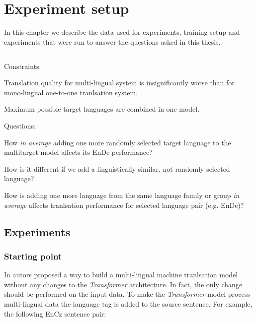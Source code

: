 \chapter{Experiment setup}
\label{chapter:experiment_setup}

In this chapter we describe the data used for experiments, training setup
and experiments that were run to answer the questions asked in this thesis.

\section{}
\label{section:questions_and_constraints}

Constraints:
\begin{displayquote}
	Translation quality for multi-lingual system is insignificantly worse than for
	mono-lingual one-to-one tranlsation system.

	Maximum possible target languages are combined in one model.
\end{displayquote}

Questions:
\begin{displayquote}
	How \emph{in average} adding one more randomly selected target language
	to the multitarget model affects its En\to{}De performance?

	How is it different if we add a linguistically similar, not randomly selected language?

	How is adding one more language from the same language family or group 
	\emph{in average} affects tranlsation performance for selected language
	pair (e.g. En\to{}De)?
\end{displayquote}



\section{Experiments}
\label{section:experiments}
\subsection{Starting point}
\label{subsection:starting_point}

In \cite{johnson-etal-2017-googles} autors proposed a way to build a multi-lingual
machine tranlsation model without any changes to the \emph{Transformer} architecture.
In fact, the only change should be performed on the input data. To make the \emph{Transformer}
model process multi-lingual data the language tag is added to the source sentence.
For example, the following En\to{}Cz sentence pair:


